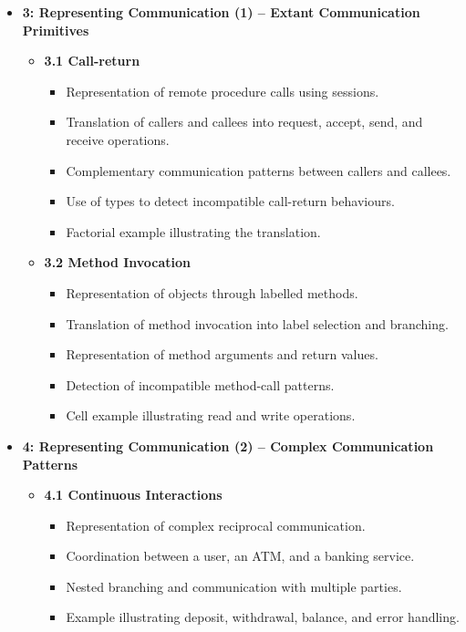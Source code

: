 \begin{itemize}
    \item \textbf{3: Representing Communication (1) -- Extant Communication Primitives}
    \begin{itemize}
        \item \textbf{3.1 Call-return}
        \begin{itemize}
            \item Representation of remote procedure calls using sessions.
            \item Translation of callers and callees into request, accept, send, and receive operations.
            \item Complementary communication patterns between callers and callees.
            \item Use of types to detect incompatible call-return behaviours.
            \item Factorial example illustrating the translation.
        \end{itemize}

        \item \textbf{3.2 Method Invocation}
        \begin{itemize}
            \item Representation of objects through labelled methods.
            \item Translation of method invocation into label selection and branching.
            \item Representation of method arguments and return values.
            \item Detection of incompatible method-call patterns.
            \item Cell example illustrating read and write operations.
        \end{itemize}
    \end{itemize}

    \item \textbf{4: Representing Communication (2) -- Complex Communication Patterns}
    \begin{itemize}
        \item \textbf{4.1 Continuous Interactions}
        \begin{itemize}
            \item Representation of complex reciprocal communication.
            \item Coordination between a user, an ATM, and a banking service.
            \item Nested branching and communication with multiple parties.
            \item Example illustrating deposit, withdrawal, balance, and error handling.
        \end{itemize}


\end{itemize}
\end{itemize}
